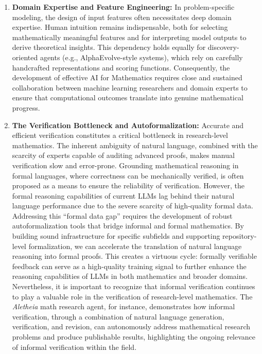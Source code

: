 \documentclass[11pt]{article}
\numberwithin{equation}{section}
\begin{document}
\begin{enumerate}
    \item \textbf{Domain Expertise and Feature Engineering:} In problem-specific modeling, the design of input features often necessitates deep domain expertise. Human intuition remains indispensable, both for selecting mathematically meaningful features and for interpreting model outputs to derive theoretical insights. This dependency holds equally for discovery-oriented agents (e.g., AlphaEvolve-style systems), which rely on carefully handcrafted representations and scoring functions. Consequently, the development of effective AI for Mathematics requires close and sustained collaboration between machine learning researchers and domain experts to ensure that computational outcomes translate into genuine mathematical progress.

    \item \textbf{The Verification Bottleneck and Autoformalization:} Accurate and efficient verification constitutes a critical bottleneck in research-level mathematics. The inherent ambiguity of natural language, combined with the scarcity of experts capable of auditing advanced proofs, makes manual verification slow and error-prone. Grounding mathematical reasoning in formal languages, where correctness can be mechanically verified, is often proposed as a means to ensure the reliability of verification. However, the formal reasoning capabilities of current LLMs lag behind their natural language performance due to the severe scarcity of high-quality formal data. Addressing this ``formal data gap'' requires the development of robust autoformalization tools that bridge informal and formal mathematics. By building sound infrastructure for specific subfields and supporting repository-level formalization, we can accelerate the translation of natural language reasoning into formal proofs. This creates a virtuous cycle: formally verifiable feedback can serve as a high-quality training signal to further enhance the reasoning capabilities of LLMs in both mathematics and broader domains. Nevertheless, it is important to recognize that informal verification continues to play a valuable role in the verification of research-level mathematics. The \textit{Aletheia} \cite{feng2026towards} math research agent, for instance, demonstrates how informal verification, through a combination of natural language generation, verification, and revision, can autonomously address mathematical research problems and produce publishable results, highlighting the ongoing relevance of informal verification within the field.


\end{enumerate}
\end{document}

